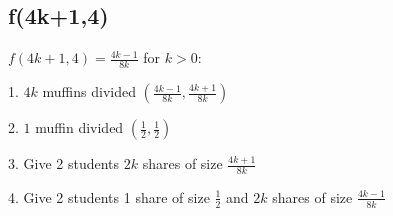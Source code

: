 \documentclass[a4paper]{article}
\begin{document}
\subsection{f(4k+1,4)}
\hspace{4ex}
$f(4k+1,4) = \frac{4k-1}{8k}$ for $k > 0$:

\noindent
\hspace{4ex}
1. $4k$ muffins divided $(\frac{4k-1}{8k},\frac{4k+1}{8k})$

\noindent
\hspace{4ex}
2. $1$ muffin divided $(\frac{1}{2},\frac{1}{2})$

\noindent
\hspace{4ex}
3. Give 2 students $2k$ shares of size $\frac{4k+1}{8k}$

\noindent
\hspace{4ex}
4. Give 2 students 1 share of size $\frac{1}{2}$ and $2k$ shares of size $\frac{4k-1}{8k}$
\end{document}
